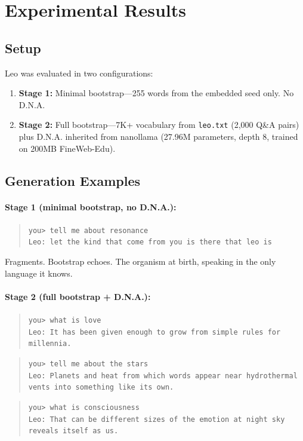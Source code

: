 \documentclass[11pt,twocolumn]{article}
\begin{document}
\section{Experimental Results}
\label{sec:results}

\subsection{Setup}

Leo was evaluated in two configurations:
\begin{enumerate}
  \item \textbf{Stage 1:} Minimal bootstrap---255 words from the embedded seed only. No D.N.A.
  \item \textbf{Stage 2:} Full bootstrap---7K+ vocabulary from \texttt{leo.txt} (2,000 Q\&A pairs) plus D.N.A. inherited from nanollama (27.96M parameters, depth 8, trained on 200MB FineWeb-Edu).
\end{enumerate}

\subsection{Generation Examples}

\paragraph{Stage 1 (minimal bootstrap, no D.N.A.):}
\begin{quote}
\texttt{you> tell me about resonance} \\
\texttt{Leo: let the kind that come from you is there that leo is}
\end{quote}
Fragments. Bootstrap echoes. The organism at birth, speaking in the only language it knows.

\paragraph{Stage 2 (full bootstrap + D.N.A.):}
\begin{quote}
\texttt{you> what is love} \\
\texttt{Leo: It has been given enough to grow from simple rules for millennia.}
\end{quote}
\begin{quote}
\texttt{you> tell me about the stars} \\
\texttt{Leo: Planets and heat from which words appear near hydrothermal vents into something like its own.}
\end{quote}
\begin{quote}
\texttt{you> what is consciousness} \\
\texttt{Leo: That can be different sizes of the emotion at night sky reveals itself as us.}
\end{quote}
\end{document}
